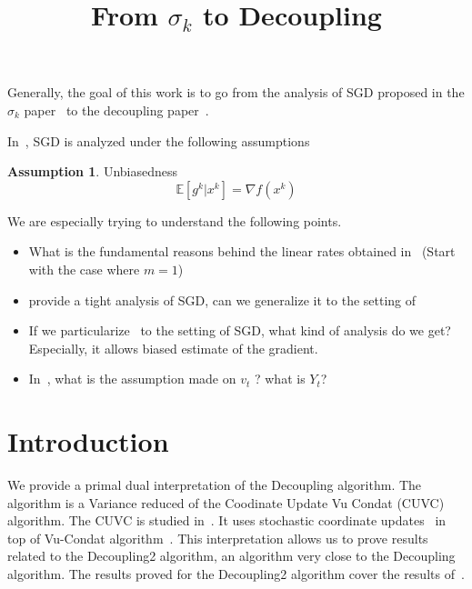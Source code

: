 \documentclass{article}
\title{From $\sigma_k$ to Decoupling}
\newcommand{\bE}{{\mathbb E}}
\theoremstyle{definition}
\newtheorem{assumption}{Assumption}
\begin{document}
\maketitle

\begin{abstract} 
\end{abstract}




Generally, the goal of this work is to go from the analysis of SGD proposed in the $\sigma_k$ paper~\cite{gorbunov2019unified} to the decoupling paper~\cite{mishchenko2019stochastic}.

In~\cite{gorbunov2019unified}, SGD is analyzed under the following assumptions 
\begin{assumption}
Unbiasedness
\begin{equation}
    \bE[g^k|x^k] = \nabla f(x^k)
\end{equation}
\end{assumption}

We are especially trying to understand the following points.
\begin{itemize}
    \item What is the fundamental reasons behind the linear rates obtained in~\cite{mishchenko2019stochastic} (Start with the case where $m=1$)
    \item \cite{gorbunov2019unified} provide a tight analysis of SGD, can we generalize it to the setting of~\cite{mishchenko2019stochastic}
    \item If we particularize~\cite{mishchenko2019stochastic} to the setting of SGD, what kind of analysis do we get? Especially, it allows biased estimate of the gradient.
    \item In~\cite{mishchenko2019stochastic}, what is the assumption made on $v_t$ ? what is $Y_t$?
\end{itemize}

\section{Introduction}

We provide a primal dual interpretation of the Decoupling algorithm. The algorithm is a Variance reduced of the Coodinate Update Vu Condat (CUVC) algorithm. The CUVC is studied in~\cite{Fercoq,Yin}. It uses stochastic coordinate updates~\cite{Iutzeler, Yin, Pesquet Combettes} in top of Vu-Condat algorithm~\cite{Vu, Condat, Chambolle-Pock}.
This interpretation allows us to prove results related to the Decoupling2 algorithm, an algorithm very close to the Decoupling algorithm. The results proved for the Decoupling2 algorithm cover the results of~\cite{mishchenko2019stochastic}. 
\end{document}
